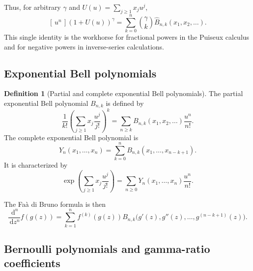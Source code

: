 \documentclass[11pt,oneside]{article}
\numberwithin{equation}{section}
\theoremstyle{plain}
\theoremstyle{definition}
\newtheorem{definition}[theorem]{Definition}
\theoremstyle{remark}
\newcommand{\dd}{\,\mathrm d}
\newcommand{\Bhat}{\widehat{B}}
\newcommand{\Coeff}[2]{[\,#1^{#2}\,]}
\begin{document}
Thus, for arbitrary $\gamma$ and $U(u)=\sum_{j\ge1}x_ju^j$,
\begin{equation}\label{eq:generalized-binomial-bell}
 \Coeff{u}{n}(1+U(u))^\gamma
 =\sum_{k=0}^{n}\binom{\gamma}{k}
   \Bhat_{n,k}(x_1,x_2,\ldots).
\end{equation}
This single identity is the workhorse for fractional powers in the Puiseux
calculus and for negative powers in inverse-series calculations.

\subsection{Exponential Bell polynomials}

\begin{definition}[Partial and complete exponential Bell polynomials]
The partial exponential Bell polynomial $B_{n,k}$ is defined by
\[
 \frac1{k!}\left(\sum_{j\ge1}x_j\frac{u^j}{j!}\right)^k
 =\sum_{n\ge k}B_{n,k}(x_1,x_2,\ldots)\frac{u^n}{n!}.
\]
The complete exponential Bell polynomial is
\[
 Y_n(x_1,\ldots,x_n)=\sum_{k=0}^{n}B_{n,k}(x_1,\ldots,x_{n-k+1}).
\]
It is characterized by
\begin{equation}\label{eq:complete-bell-exp}
 \exp\!\left(\sum_{j\ge1}x_j\frac{u^j}{j!}\right)
 =\sum_{n\ge0}Y_n(x_1,\ldots,x_n)\frac{u^n}{n!}.
\end{equation}
\end{definition}

The Fa\`a di Bruno formula is then
\begin{equation}\label{eq:faa-di-bruno}
 \frac{\dd^n}{\dd z^n}f(g(z))
 =\sum_{k=1}^{n}f^{(k)}(g(z))
 B_{n,k}\bigl(g'(z),g''(z),\ldots,g^{(n-k+1)}(z)\bigr).
\end{equation}

\subsection{Bernoulli polynomials and gamma-ratio coefficients}
\end{document}
